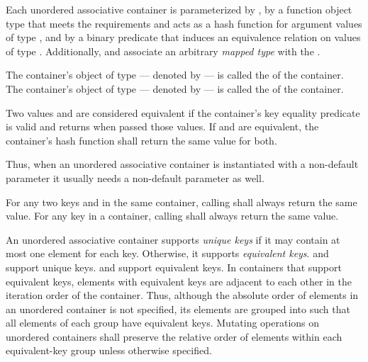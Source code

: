 \pnum
Each unordered associative container is parameterized by ,
by a function object type  that meets the 
requirements and acts as a hash function for
argument values of type , and by a binary predicate 
that induces an equivalence relation on values of type .
Additionally,  and  associate
an arbitrary \textit{mapped type}  with the .

\pnum
{}%
%
The container's object of type  --- denoted by
 --- is called the  of the
container. The container's object of type  ---
denoted by  --- is called the
 of the container.

\pnum
{}%
Two values  and  are
considered equivalent if the container's
key equality predicate
 is valid and returns
 when passed those values.  If  and
 are equivalent, the container's hash function shall
return the same value for both.
\begin{note}
Thus, when an unordered associative container is instantiated with
a non-default  parameter it usually needs a non-default 
parameter as well.
\end{note}
For any two keys  and  in the same container,
calling  shall always return the same value.
For any key  in a container, calling 
shall always return the same value.

\pnum
{}%
%
An unordered associative container supports \textit{unique keys} if it
may contain at most one element for each key.  Otherwise, it supports
\textit{equivalent keys}.   and 
support unique keys.  and 
support equivalent keys.  In containers that support equivalent keys,
elements with equivalent keys are adjacent to each other
in the iteration order of the container. Thus, although the absolute order
of elements in an unordered container is not specified, its elements are
grouped into  such that all elements of each
group have equivalent keys. Mutating operations on unordered containers shall
preserve the relative order of elements within each equivalent-key group
unless otherwise specified.

